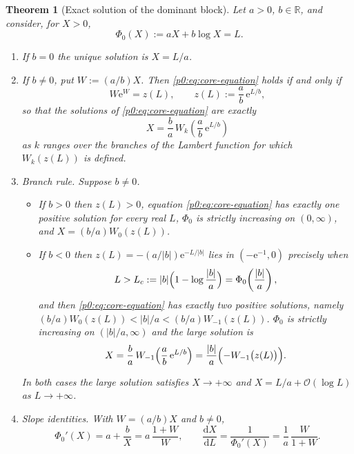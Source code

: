 \documentclass[11pt,a4paper,oneside]{book}
\theoremstyle{plain}
\newtheorem{theorem}{Theorem}[chapter]
\theoremstyle{definition}
\theoremstyle{remark}
\newcommand{\Real}{\mathbb{R}}
\newcommand{\e}{\mathrm{e}}
\newcommand{\dd}{\mathrm{d}}
\newcommand{\bigO}{\mathcal{O}}
\newcommand{\Wlam}{W}
\begin{document}
\begin{theorem}[Exact solution of the dominant block]\label{p0:thm:lambert-core}
Let $a>0$, $b\in\Real$, and consider, for $X>0$,
\begin{equation}\label{p0:eq:core-equation}
 \Phi_0(X):=aX+b\log X=L .
\end{equation}
\begin{enumerate}
\item If $b=0$ the unique solution is $X=L/a$.
\item If $b\ne0$, put $W:=(a/b)X$.  Then \eqref{p0:eq:core-equation} holds if
      and only if
      \begin{equation}\label{p0:eq:core-W-equation}
       W\e^{W}=z(L),\qquad z(L):=\frac ab\,\e^{L/b},
      \end{equation}
      so that the solutions of \eqref{p0:eq:core-equation} are exactly
      \begin{equation}\label{p0:eq:core-lambert}
       X=\frac ba\,\Wlam_k\!\left(\frac ab\,\e^{L/b}\right)
      \end{equation}
      as $k$ ranges over the branches of the Lambert function for which
      $\Wlam_k(z(L))$ is defined.
\item \emph{Branch rule.}  Suppose $b\ne0$.
      \begin{itemize}
      \item If $b>0$ then $z(L)>0$, equation \eqref{p0:eq:core-equation} has
            exactly one positive solution for every real $L$, $\Phi_0$ is
            strictly increasing on $(0,\infty)$, and
            $X=(b/a)\Wlam_0(z(L))$.
      \item If $b<0$ then $z(L)=-(a/|b|)\e^{-L/|b|}$ lies in $(-\e^{-1},0)$
            precisely when
            \begin{equation}\label{p0:eq:core-threshold}
             L>L_c:=|b|\Bigl(1-\log\frac{|b|}{a}\Bigr)
                  =\Phi_0\!\left(\frac{|b|}{a}\right),
            \end{equation}
            and then \eqref{p0:eq:core-equation} has exactly two positive
            solutions, namely
            $(b/a)\Wlam_0(z(L))<|b|/a<(b/a)\Wlam_{-1}(z(L))$.
            $\Phi_0$ is strictly increasing on $(|b|/a,\infty)$ and the large
            solution is
            \begin{equation}\label{p0:eq:core-lambert-minus}
             X=\frac ba\,\Wlam_{-1}\!\left(\frac ab\,\e^{L/b}\right)
              =\frac{|b|}{a}\Bigl(-\Wlam_{-1}\bigl(z(L)\bigr)\Bigr).
            \end{equation}
      \end{itemize}
      In both cases the large solution satisfies $X\to+\infty$ and
      $X=L/a+\bigO(\log L)$ as $L\to+\infty$.
\item \emph{Slope identities.}  With $W=(a/b)X$ and $b\ne0$,
      \begin{equation}\label{p0:eq:core-slope}
       \Phi_0'(X)=a+\frac bX=a\,\frac{1+W}{W},
       \qquad
       \frac{\dd X}{\dd L}=\frac1{\Phi_0'(X)}=\frac1a\,\frac{W}{1+W} .
      \end{equation}
\end{enumerate}
\end{theorem}
\end{document}
